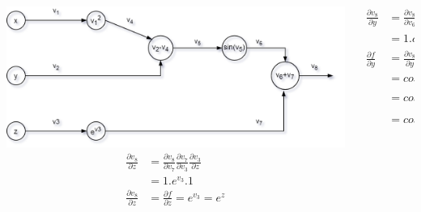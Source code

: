 \begin{frame}{}
	\begin{columns}[T]
		\begin{column}{.5\textwidth}
			\includegraphics[width=1.1\textwidth, center]{figuras/backprop_eg1.png}
			\begin{align*}
					\frac{\partial v_8}{\partial z}&= 
					\frac{\partial v_8}{\partial v_7} 
					\frac{\partial v_7}{\partial v_3} 
					\frac{\partial v_3}{\partial z}  \\
					&= 1.e^{v_3}.1 \\
					\frac{\partial v_8}{\partial z}&=\frac{\partial f}{\partial z} 
					= e^{v_3}=e^z 
			\end{align*}
		\end{column}
		\begin{column}{.5\textwidth}
			\begin{align*}
			\frac{\partial v_8}{\partial y}&= 
			\frac{\partial v_8}{\partial v_6} 
			\frac{\partial v_6}{\partial v_5} 
			\frac{\partial v_5}{\partial v_2}  
			\frac{\partial v_2}{\partial y}\\
			& = 1.cos(v_5).v^4.1 \\
			\frac{\partial f}{\partial y}&=\frac{\partial v_8}{\partial y}
			= cos(v_5)v^4 \\
			&= cos(v_2v_4)v_4 \\
			&= cos(v^2_1y)v^2_1 \\
			&= cos(x^2y)x^2
			\end{align*}
		\end{column}
	\end{columns}
\end{frame}